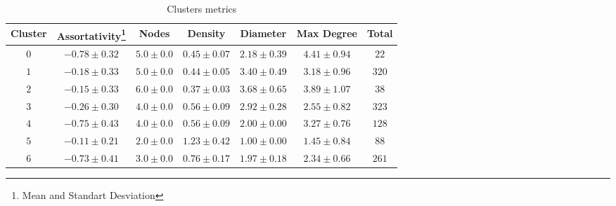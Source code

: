 \documentclass[12pt]{article}
\makeatletter
\newcommand\footnoteref[1]{\protected@xdef\@thefnmark{\ref{#1}}\@footnotemark}
\makeatother
\begin{document}
\begin{table}[H]
\addtolength{\tabcolsep}{-2pt}
\begin{minipage}{\textwidth}
\centering
\vspace{3mm}
\begin{tabular}{ccccccc}
\textbf{Cluster} & \textbf{Assortativity}\footnote{\label{note1}Mean and Standart Desviation} & \textbf{Nodes}\footnoteref{note1} & \textbf{Density}\footnoteref{note1} & \textbf{Diameter}\footnoteref{note1} & \textbf{Max Degree}\footnoteref{note1}  & \textbf{Total}   \\
\hline
$0$ & $-0.78 \pm 0.32$ & $5.0 \pm 0.0$ & $0.45 \pm 0.07$ & $2.18 \pm 0.39$ & $4.41 \pm 0.94$ & $22$ \\
$1$ & $-0.18 \pm 0.33$ & $5.0 \pm 0.0$ & $0.44 \pm 0.05$ & $3.40 \pm 0.49$ & $3.18 \pm 0.96$ & $320$ \\
$2$ & $-0.15 \pm 0.33$ & $6.0 \pm 0.0$ & $0.37 \pm 0.03$ & $3.68 \pm 0.65$ & $3.89 \pm 1.07$ & $38$ \\
$3$ & $-0.26 \pm 0.30$ & $4.0 \pm 0.0$ & $0.56 \pm 0.09$ & $2.92 \pm 0.28$ & $2.55 \pm 0.82$ & $323$ \\
$4$ & $-0.75 \pm 0.43$ & $4.0 \pm 0.0$ & $0.56 \pm 0.09$ & $2.00 \pm 0.00$ & $3.27 \pm 0.76$ & $128$ \\
$5$ & $-0.11 \pm 0.21$ & $2.0 \pm 0.0$ & $1.23 \pm 0.42$ & $1.00 \pm 0.00$ & $1.45 \pm 0.84$ & $88$ \\
$6$ & $-0.73 \pm 0.41$ & $3.0 \pm 0.0$ & $0.76 \pm 0.17$ & $1.97 \pm 0.18$ & $2.34 \pm 0.66$ & $261$ \\
\hline
\hline
\end{tabular}

\caption{Clusters metrics}
\label{tab:clrquality}
\end{minipage}
\end{table}
\end{document}
